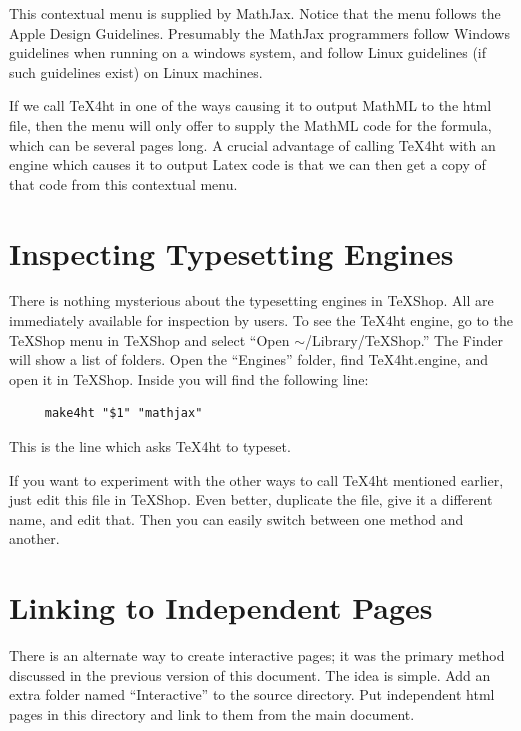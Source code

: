 \documentclass[11pt, oneside]{article}   	%
\begin{document}
This contextual menu is supplied by MathJax. Notice that the menu follows the Apple Design Guidelines. Presumably the MathJax programmers follow Windows guidelines when running on a windows system, and follow Linux guidelines (if such guidelines exist) on Linux machines.

If we call TeX4ht in one of the ways causing it to output MathML to the html file, then the menu will only offer to supply the MathML code for the formula, which can be several pages long. A crucial advantage of calling TeX4ht with an engine which causes it to output Latex code is that we can then get a copy of that code from this contextual menu.

\section{Inspecting Typesetting Engines}

There is nothing mysterious about the typesetting engines in TeXShop. All are immediately available for inspection by users. To see the TeX4ht engine, go to the TeXShop menu in TeXShop and select ``Open $\sim$/Library/TeXShop.'' The Finder will show a list of folders. Open the ``Engines'' folder, find TeX4ht.engine, and open it in TeXShop. Inside you will find the following line:
\begin{verbatim}
     make4ht "$1" "mathjax"
\end{verbatim}
This is the line which asks TeX4ht to typeset. 

If you want to experiment with the other ways to call TeX4ht mentioned earlier, just edit this file in TeXShop.
Even better, duplicate the file, give it a different name, and edit that. Then you can easily switch between one method and another.

\section{Linking to Independent Pages}

There is an alternate way to create interactive pages; it was the primary method discussed in the previous version of this document. The idea is simple. Add an extra folder named ``Interactive'' to the source directory. Put independent html pages in this directory and link to them from the main document.
\end{document}
